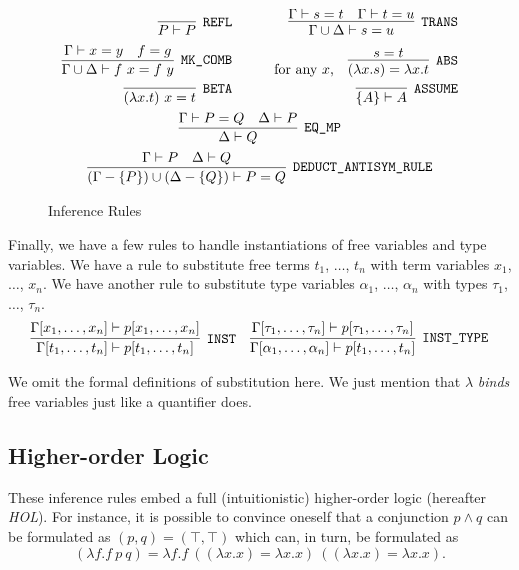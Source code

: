 \begin{figure}
  \begin{gather*}
    \begin{aligned}
      \infer[\code{REFL}]{P\vdash P}{} &\qquad&
      \infer[\code{TRANS}]{\Gamma\cup\Delta\vdash s=u}{\Gamma\vdash s=t&\Gamma\vdash t=u}\\
      \infer[\code{MK\_COMB}]{\Gamma\cup\Delta\vdash f\ x=f\ y}{\Gamma\vdash x = y & f = g} &&
      \text{for any $x$,}\quad \infer[\code{ABS}]{(\lambda x. s) = \lambda x. t}{s = t}\\
      \infer[\code{BETA}]{(\lambda x. t)\ x = t}{}&&
      \infer[\code{ASSUME}]{\{A\} \vdash A}{}
    \end{aligned}\\
    \infer[\code{EQ\_MP}]{\Delta\vdash Q}{\Gamma\vdash P = Q & \Delta\vdash P}\\
    \infer[\code{DEDUCT\_ANTISYM\_RULE}]{(\Gamma - \{P\})\cup(\Delta - \{Q\})\vdash P = Q}{\Gamma\vdash P & \Delta\vdash Q}\\
  \end{gather*}
  \caption{Inference Rules}
  \label{fig:HOLInferenceRules}
\end{figure}

Finally, we have a few rules to handle instantiations of free variables and type variables. We have a rule to substitute free terms $t_1$, $\ldots$, $t_n$ with term variables $x_1$, $\ldots$, $x_n$. We have another rule to substitute type variables $\alpha_1$, $\ldots$, $\alpha_n$ with types $\tau_1$, $\ldots$, $\tau_n$.
\begin{align*}
  \infer[\code{INST}]{\Gamma[t_1,\ldots,t_n]
    \vdash p[t_1,\ldots,t_n]}
  {\Gamma[x_1,\ldots,x_n]\vdash p[x_1,\ldots,x_n]}&&
  \infer[\code{INST\_TYPE}]{\Gamma[\alpha_1,\ldots,\alpha_n]
    \vdash p[t_1,\ldots,t_n]}
  {\Gamma[\tau_1,\ldots,\tau_n]\vdash p[\tau_1,\ldots,\tau_n]}
\end{align*}

We omit the formal definitions of substitution here. We just mention that $\lambda$ \emph{binds} free variables just like a quantifier does.

\subsection{Higher-order Logic}
These inference rules embed a full (intuitionistic) higher-order logic (hereafter \emph{HOL}). For instance, it is possible to convince oneself that a conjunction $p \wedge q$ can be formulated as $(p,q) = (\top,\top)$ which can, in turn, be formulated as
\begin{displaymath}
(\lambda f. f\ p\ q) = \lambda f. f\ ((\lambda x. x) = \lambda x. x)\ ((\lambda x. x) = \lambda x. x).
\end{displaymath}

